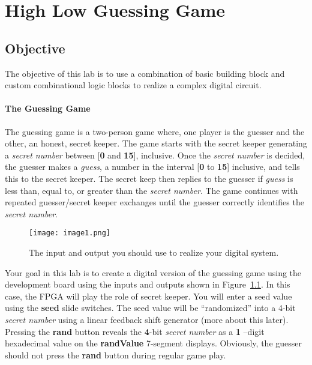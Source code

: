 \chapter{High Low Guessing Game}
\label{chapter:RPS}
\graphicspath{ {./Lab04HighLow/Fig} }

\hypertarget{objective}{%
\section{\texorpdfstring{Objective }{Objective }}
\label{section:objectiveHighLowguess}}

The objective of this lab is to use a combination of basic building
block and custom combinational logic blocks to realize a complex digital
circuit.

\subsubsection{The Guessing Game}

The guessing game is a two-person game where, one player is the guesser
and the other, an honest, secret keeper. The game starts with the secret
keeper generating a \emph{secret number} between {[}\textbf{0} and
\textbf{15}{]}, inclusive. Once the \emph{secret number} is decided, the
guesser makes a \emph{guess}, a number in the interval {[}\textbf{0} to
\textbf{15}{]} inclusive, and tells this to the secret keeper. The
secret keep then replies to the guesser if \emph{guess} is less than,
equal to, or greater than the \emph{secret number}. The game continues
with repeated guesser/secret keeper exchanges until the guesser
correctly identifies the \emph{secret number}.

\begin{figure}[ht]
\texttt{[image: image1.png]}
\caption{The input and output you should use to realize your digital system.}
\label{fig:inputOutputDevBoard}
\end{figure}

Your goal in this lab is to create a digital version of the guessing
game using the development board using the inputs and outputs shown in
Figure~\ref{fig:inputOutputDevBoard}. In this case, the FPGA will play the role of secret keeper.
You will enter a seed value using the \textbf{seed} slide switches. The
seed value will be ``randomized'' into a 4-bit \emph{secret number}
using a linear feedback shift generator (more about this later).
Pressing the \textbf{rand} button reveals the \textbf{4}-bit
\emph{secret number} as a \textbf{1} --digit hexadecimal value on the
\textbf{randValue} 7-segment displays. Obviously, the guesser should not
press the \textbf{rand} button during regular game play.

